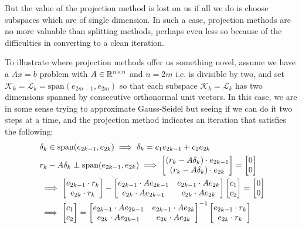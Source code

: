 \documentclass[11pt]{article}
\begin{document}
But the value of the projection method is lost on us if all we do is choose subspaces which are of single dimension. In such a case, projection methods are no more valuable than splitting methods, perhaps even less so because of the difficulties in converting to a clean iteration.

To illustrate where projection methods offer us something novel, assume we have a $Ax = b$ problem with $A \in \mathbb{R}^{n \times n}$ and $n = 2m$ i.e. is divisible by two, and set $\mathcal{K}_k = \mathcal{L}_k = \mathrm{span}(e_{2m-1}, e_{2m})$ so that each subspace $\mathcal{K}_k = \mathcal{L}_k$ has two dimensions spanned by consecutive orthonormal unit vectors. In this case, we are in some sense trying to approximate Gauss-Seidel but seeing if we can do it two steps at a time, and the projection method indicates an iteration that satisfies the following:
\begin{align*}
&\delta_k \in \mathrm{span}(e_{2k-1}, e_{2k}) \implies \delta_k = c_1 e_{2k-1} + c_2 e_{2k} \\
& r_k - A \delta_k \perp \mathrm{span}(e_{2k-1},e_{2k}) \implies \begin{bmatrix} (r_k - A \delta_k) \cdot e_{2k-1} \\ (r_k - A \delta_k) \cdot e_{2k} \end{bmatrix} = \begin{bmatrix} 0 \\ 0\end{bmatrix}\\
& \implies \begin{bmatrix} e_{2k-1} \cdot r_k \\ e_{2k} \cdot r_k \end{bmatrix} -
\begin{bmatrix}
	e_{2k - 1} \cdot A e_{2k-1} & e_{2k-1} \cdot A e_{2k} \\
	e_{2k} \cdot A e_{2k-1} & e_{2k} \cdot A e_{2k}
\end{bmatrix}
\begin{bmatrix} c_1 \\ c_2 \end{bmatrix} = \begin{bmatrix} 0 \\ 0 \end{bmatrix} \\
& \implies \begin{bmatrix} c_1 \\ c_2 \end{bmatrix} = \begin{bmatrix}
	e_{2k - 1} \cdot A e_{2k-1} & e_{2k-1} \cdot A e_{2k} \\
	e_{2k} \cdot A e_{2k-1} & e_{2k} \cdot A e_{2k}
\end{bmatrix}^{-1}
\begin{bmatrix} e_{2k-1} \cdot r_k \\ e_{2k} \cdot r_k \end{bmatrix}
\end{align*}
\end{document}
